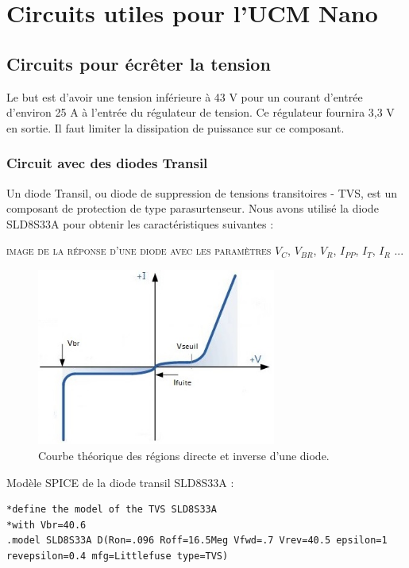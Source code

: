 \chapter{Circuits utiles pour l'UCM Nano}
\label{chap:deuxiemechapitre}

\section{Circuits pour écrêter la tension}

Le but est d'avoir une tension inférieure à 43 V pour un courant d'entrée d'environ 25 A à l'entrée du régulateur de tension. Ce régulateur fournira 3,3 V en sortie. Il faut limiter la dissipation de puissance sur ce composant.

\subsection{Circuit avec des diodes Transil}

Un diode Transil, ou diode de suppression de tensions transitoires - TVS, est un composant de protection de type parasurtenseur. Nous avons utilisé la diode SLD8S33A pour obtenir les caractéristiques suivantes :

\textsc{image de la réponse d'une diode avec les paramètres $V_C$, $V_{BR}$, $V_R$, $I_{PP}$, $I_T$, $I_R$ ...}

\begin{figure}[H]
    \centering
    \includegraphics[width=0.70\textwidth]{images/reponse-theorique-diode}
    \caption{Courbe théorique des régions directe et inverse d'une diode.}
    \label{fig:reponse-theorique-diode}
\end{figure}

Modèle SPICE de la diode transil SLD8S33A :

\begin{lstlisting}
*define the model of the TVS SLD8S33A
*with Vbr=40.6
.model SLD8S33A D(Ron=.096 Roff=16.5Meg Vfwd=.7 Vrev=40.5 epsilon=1 revepsilon=0.4 mfg=Littlefuse type=TVS)
\end{lstlisting}


